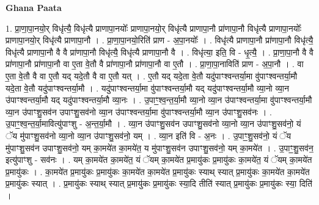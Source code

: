 \documentclass[17pt]{extarticle}
\begin{document}
\textbf{Ghana Paata } \newline

1. प्रा॒णा॒पा॒नयो॒र् विधृ॑त्यै॒ विधृ॑त्यै प्राणापा॒नयोः᳚ प्राणापा॒नयो॒र् विधृ॑त्यै प्राणापा॒नौ प्रा॑णापा॒नौ विधृ॑त्यै प्राणापा॒नयोः᳚ प्राणापा॒नयो॒र् विधृ॑त्यै प्राणापा॒नौ । . प्रा॒णा॒पा॒नयो॒रिति॑ प्राण - अ॒पा॒नयोः᳚ । . विधृ॑त्यै प्राणापा॒नौ प्रा॑णापा॒नौ विधृ॑त्यै॒ विधृ॑त्यै प्राणापा॒नौ वै वै प्रा॑णापा॒नौ विधृ॑त्यै॒ विधृ॑त्यै प्राणापा॒नौ वै । . विधृ॑त्या॒ इति॒ वि - धृ॒त्यै॒ । . प्रा॒णा॒पा॒नौ वै वै प्रा॑णापा॒नौ प्रा॑णापा॒नौ वा ए॒ता वे॒तौ वै प्रा॑णापा॒नौ प्रा॑णापा॒नौ वा ए॒तौ । . प्रा॒णा॒पा॒नाविति॑ प्राण - अ॒पा॒नौ । . वा ए॒ता वे॒तौ वै वा ए॒तौ यद् यदे॒तौ वै वा ए॒तौ यत् । . ए॒तौ यद् यदे॒ता वे॒तौ यदु॑पाꣳश्वन्तर्या॒मा वु॑पाꣳश्वन्तर्या॒मौ यदे॒ता वे॒तौ यदु॑पाꣳश्वन्तर्या॒मौ । . यदु॑पाꣳश्वन्तर्या॒मा वु॑पाꣳश्वन्तर्या॒मौ यद् यदु॑पाꣳश्वन्तर्या॒मौ व्या॒नो व्या॒न उ॑पाꣳश्वन्तर्या॒मौ यद् यदु॑पाꣳश्वन्तर्या॒मौ व्या॒नः । . उ॒पाꣳ॒॒श्व॒न्त॒र्या॒मौ व्या॒नो व्या॒न उ॑पाꣳश्वन्तर्या॒मा वु॑पाꣳश्वन्तर्या॒मौ व्या॒न उ॑पाꣳशु॒सव॑न उपाꣳशु॒सव॑नो व्या॒न उ॑पाꣳश्वन्तर्या॒मा वु॑पाꣳश्वन्तर्या॒मौ व्या॒न उ॑पाꣳशु॒सव॑नः । . उ॒पाꣳ॒॒श्व॒न्त॒र्या॒मावित्यु॑पाꣳशु - अ॒न्त॒र्या॒मौ । . व्या॒न उ॑पाꣳशु॒सव॑न उपाꣳशु॒सव॑नो व्या॒नो व्या॒न उ॑पाꣳशु॒सव॑नो॒ यं ॅय मु॑पाꣳशु॒सव॑नो व्या॒नो व्या॒न उ॑पाꣳशु॒सव॑नो॒ यम् । . व्या॒न इति॑ वि - अ॒नः । . उ॒पाꣳ॒॒शु॒सव॑नो॒ यं ॅय मु॑पाꣳशु॒सव॑न उपाꣳशु॒सव॑नो॒ यम् का॒मये॑त का॒मये॑त॒ य मु॑पाꣳशु॒सव॑न उपाꣳशु॒सव॑नो॒ यम् का॒मये॑त । . उ॒पाꣳ॒॒शु॒सव॑न॒ इत्यु॑पाꣳशु - सव॑नः । . यम् का॒मये॑त का॒मये॑त॒ यं ॅयम् का॒मये॑त प्र॒मायु॑कः प्र॒मायु॑कः का॒मये॑त॒ यं ॅयम् का॒मये॑त प्र॒मायु॑कः । . का॒मये॑त प्र॒मायु॑कः प्र॒मायु॑कः का॒मये॑त का॒मये॑त प्र॒मायु॑कः स्याथ् स्यात् प्र॒मायु॑कः का॒मये॑त का॒मये॑त प्र॒मायु॑कः स्यात् । . प्र॒मायु॑कः स्याथ् स्यात् प्र॒मायु॑कः प्र॒मायु॑कः स्या॒दि तीति॑ स्यात् प्र॒मायु॑कः प्र॒मायु॑कः स्या॒ दिति॑ । \newline
\end{document}
